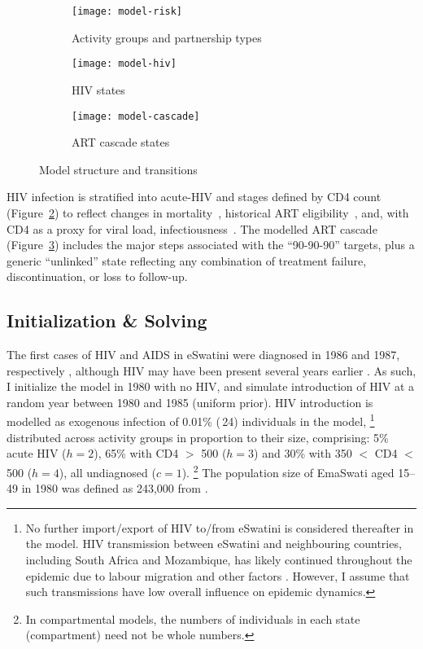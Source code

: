 \begin{figure}
  \begin{subfigure}{\linewidth}
    \texttt{[image: model-risk]}
    \caption{Activity groups and partnership types}
    \label{fig:model-risk}
  \end{subfigure}
  \begin{subfigure}{\linewidth}
    \texttt{[image: model-hiv]}
    \caption{HIV states}
    \label{fig:model-hiv}
  \end{subfigure}
  \begin{subfigure}{\linewidth}
    \texttt{[image: model-cascade]}
    \caption{ART cascade states}
    \label{fig:model-cascade}
  \end{subfigure}
  \caption{Model structure and transitions}
  \label{fig:model}
\end{figure}
\par
HIV infection is stratified into
acute-HIV and stages defined by CD4 count (Figure~\ref{fig:model-hiv})
to reflect changes in mortality~\cite{Mangal2017},
historical ART eligibility~\cite{EswUNGASS2010,MaxART2018},
and, with CD4 as a proxy for viral load, infectiousness~\cite{Boily2009}.
The modelled ART cascade (Figure~\ref{fig:model-cascade})
includes the major steps associated with the ``90-90-90'' targets,
plus a generic ``unlinked'' state reflecting any combination of
treatment failure, discontinuation, or loss to follow-up.
\subsection{Initialization \& Solving}\label{model.init}
The first cases of HIV and AIDS in eSwatini
were diagnosed in 1986 and 1987, respectively \cite{Whiteside2007},
although HIV may have been present several years earlier \cite{Iliffe2006}.
As such, I initialize the model in 1980 with no HIV,
and simulate introduction of HIV at a random year between 1980 and 1985 (uniform prior).
HIV introduction is modelled as
exogenous infection of 0.01\% (\ttilde\,24) individuals in the model,%
\footnote{No further import/export of HIV to/from eSwatini is considered thereafter in the model.
  HIV transmission between eSwatini and neighbouring countries,
  including South Africa and Mozambique,
  has likely continued throughout the epidemic
  due to labour migration and other factors \cite{Iliffe2006}.
  However, I assume that such transmissions have low overall influence on epidemic dynamics.}
distributed across activity groups in proportion to their size, comprising:
5\% acute HIV ($h=2$), 65\% with CD4 $>$ 500 ($h=3$) and 30\% with 350 $<$ CD4 $<$ 500 ($h=4$),
all undiagnosed ($c=1$).%
\footnote{In compartmental models, the numbers of individuals in each state (compartment)
  need not be whole numbers.}
The population size of EmaSwati aged 15--49 in 1980
was defined as 243,000 from \cite{WorldBank}.
